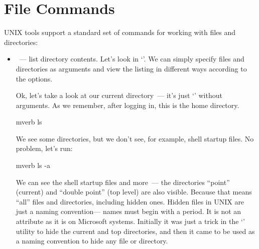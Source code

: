 \section*{File Commands}

UNIX tools support a standard set of commands for working with files and
directories:
\begin{itemize}
\item {}~--- list directory contents. Let's look in `'.
      We can simply specify files and directories as arguments and view
      the listing in different ways according to the options.

      Ok, let's take a look at our current directory~--- it's just
      `' without arguments. As we remember, after logging in,
      this is the home directory.
\begin{code}{mverb}
ls
\end{code}
We see some directories, but we don't see, for example, shell startup
files. No problem, let's run:
\begin{code}{mverb}
ls -a
\end{code}
We can see the shell startup files and more~--- the directories ``point''
(current) and ``double point'' (top level) are also visible. Because that
means ``all'' files and directories, including hidden ones. Hidden files in
UNIX are just a naming convention--- names must begin with a period.
It is not an attribute as it is on Microsoft systems. Initially it was just
a trick in the `' utility to hide the current and top directories,
and then it came to be used as a naming convention to hide any file or directory.


\end{itemize}
